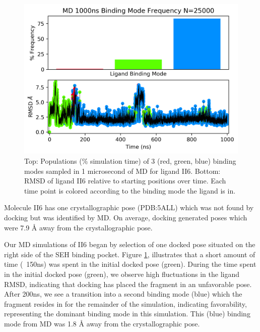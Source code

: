 \begin{figure}
    \centering
    \includegraphics{chapter5/II6/II6_1-full-bmodes-freq.png}
    \caption[Ligand II6 Binding Mode Populations]{Top: Populations (\% simulation time) of 3 (red, green, blue) binding modes sampled in 1 microsecond of MD for ligand II6. Bottom: RMSD of ligand II6 relative to starting positions over time. Each time point is colored according to the binding mode the ligand is in.}
    \label{fig:II6_bmodes}
\end{figure}

Molecule II6 has one crystallographic pose (PDB:5ALL) which was not found by docking but was identified by MD.
On average, docking generated poses which were 7.9 {\AA} away from the crystallographic pose.

Our MD simulations of II6 began by selection of one docked pose situated on the right side of the SEH binding pocket.
Figure \ref{fig:II6_bmodes}, illustrates that a short amount of time (~150ns) was spent in the initial docked pose (green).
During the time spent in the initial docked pose (green), we observe high fluctuations in the ligand RMSD, indicating that docking has placed the fragment in an unfavorable pose.
After 200ns, we see a transition into a second binding mode (blue) which the fragment resides in for the remainder of the simulation, indicating favorability, representing the dominant binding mode in this simulation.
This (blue) binding mode from MD was 1.8 {\AA} away from the crystallographic pose. 

